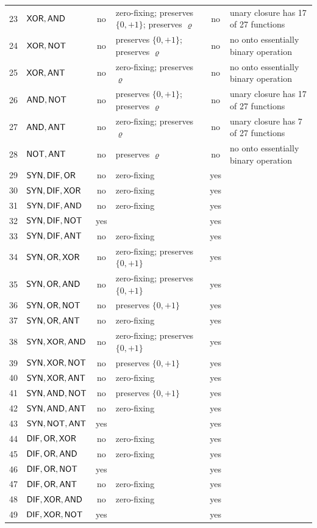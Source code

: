 \documentclass[10pt,a4paper]{article}
\begin{document}
\begin{center}
\begin{longtable}{rlcp{3.9cm}cp{3.9cm}}
23&$\mathsf{XOR}, \mathsf{AND}$&no&zero-fixing; preserves $\{0,+1\}$; preserves $\varrho$&no&unary closure has 17 of 27 functions\\
24&$\mathsf{XOR}, \mathsf{NOT}$&no&preserves $\{0,+1\}$; preserves $\varrho$&no&no onto essentially binary operation\\
25&$\mathsf{XOR}, \mathsf{ANT}$&no&zero-fixing; preserves $\varrho$&no&no onto essentially binary operation\\
26&$\mathsf{AND}, \mathsf{NOT}$&no&preserves $\{0,+1\}$; preserves $\varrho$&no&unary closure has 17 of 27 functions\\
27&$\mathsf{AND}, \mathsf{ANT}$&no&zero-fixing; preserves $\varrho$&no&unary closure has 7 of 27 functions\\
28&$\mathsf{NOT}, \mathsf{ANT}$&no&preserves $\varrho$&no&no onto essentially binary operation\\
29&$\mathsf{SYN}, \mathsf{DIF}, \mathsf{OR}$&no&zero-fixing&yes&\\
30&$\mathsf{SYN}, \mathsf{DIF}, \mathsf{XOR}$&no&zero-fixing&yes&\\
31&$\mathsf{SYN}, \mathsf{DIF}, \mathsf{AND}$&no&zero-fixing&yes&\\
32&$\mathsf{SYN}, \mathsf{DIF}, \mathsf{NOT}$&yes&&yes&\\
33&$\mathsf{SYN}, \mathsf{DIF}, \mathsf{ANT}$&no&zero-fixing&yes&\\
34&$\mathsf{SYN}, \mathsf{OR}, \mathsf{XOR}$&no&zero-fixing; preserves $\{0,+1\}$&yes&\\
35&$\mathsf{SYN}, \mathsf{OR}, \mathsf{AND}$&no&zero-fixing; preserves $\{0,+1\}$&yes&\\
36&$\mathsf{SYN}, \mathsf{OR}, \mathsf{NOT}$&no&preserves $\{0,+1\}$&yes&\\
37&$\mathsf{SYN}, \mathsf{OR}, \mathsf{ANT}$&no&zero-fixing&yes&\\
38&$\mathsf{SYN}, \mathsf{XOR}, \mathsf{AND}$&no&zero-fixing; preserves $\{0,+1\}$&yes&\\
39&$\mathsf{SYN}, \mathsf{XOR}, \mathsf{NOT}$&no&preserves $\{0,+1\}$&yes&\\
40&$\mathsf{SYN}, \mathsf{XOR}, \mathsf{ANT}$&no&zero-fixing&yes&\\
41&$\mathsf{SYN}, \mathsf{AND}, \mathsf{NOT}$&no&preserves $\{0,+1\}$&yes&\\
42&$\mathsf{SYN}, \mathsf{AND}, \mathsf{ANT}$&no&zero-fixing&yes&\\
43&$\mathsf{SYN}, \mathsf{NOT}, \mathsf{ANT}$&yes&&yes&\\
44&$\mathsf{DIF}, \mathsf{OR}, \mathsf{XOR}$&no&zero-fixing&yes&\\
45&$\mathsf{DIF}, \mathsf{OR}, \mathsf{AND}$&no&zero-fixing&yes&\\
46&$\mathsf{DIF}, \mathsf{OR}, \mathsf{NOT}$&yes&&yes&\\
47&$\mathsf{DIF}, \mathsf{OR}, \mathsf{ANT}$&no&zero-fixing&yes&\\
48&$\mathsf{DIF}, \mathsf{XOR}, \mathsf{AND}$&no&zero-fixing&yes&\\
49&$\mathsf{DIF}, \mathsf{XOR}, \mathsf{NOT}$&yes&&yes&\\

\end{longtable}
\end{center}
\end{document}
